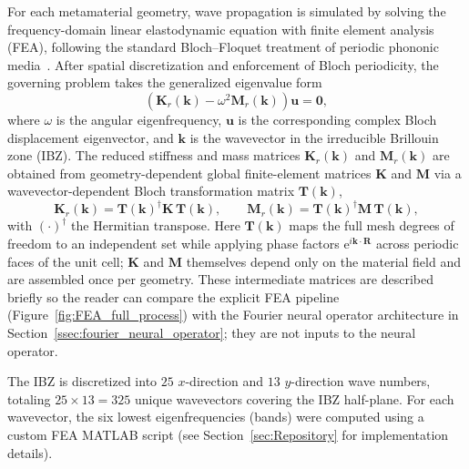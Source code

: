 \documentclass[preprint,review,12pt,numafflabel]{elsarticle}
\begin{document}
For each metamaterial geometry, wave propagation is simulated by solving the frequency-domain linear elastodynamic equation with finite element analysis (FEA), following the standard Bloch--Floquet treatment of periodic phononic media~\cite{hussein2014dynamics,kushwaha1993acoustic}. After spatial discretization and enforcement of Bloch periodicity, the governing problem takes the generalized eigenvalue form
\begin{equation}
\label{eqn:eig_PDE}
\left( \mathbf{K}_r(\mathbf{k}) - \omega^2 \mathbf{M}_r(\mathbf{k}) \right) \mathbf{u} = \mathbf{0},
\end{equation}
where $\omega$ is the angular eigenfrequency, $\mathbf{u}$ is the corresponding complex Bloch displacement eigenvector, and $\mathbf{k}$ is the wavevector in the irreducible Brillouin zone (IBZ). The reduced stiffness and mass matrices $\mathbf{K}_r(\mathbf{k})$ and $\mathbf{M}_r(\mathbf{k})$ are obtained from geometry-dependent global finite-element matrices $\mathbf{K}$ and $\mathbf{M}$ via a wavevector-dependent Bloch transformation matrix $\mathbf{T}(\mathbf{k})$,
\begin{equation}
\label{eqn:reduced_KM}
\mathbf{K}_r(\mathbf{k}) = \mathbf{T}(\mathbf{k})^{\dagger}\mathbf{K}\,\mathbf{T}(\mathbf{k}),
\qquad
\mathbf{M}_r(\mathbf{k}) = \mathbf{T}(\mathbf{k})^{\dagger}\mathbf{M}\,\mathbf{T}(\mathbf{k}),
\end{equation}
with $(\cdot)^{\dagger}$ the Hermitian transpose. Here $\mathbf{T}(\mathbf{k})$ maps the full mesh degrees of freedom to an independent set while applying phase factors $\mathrm{e}^{i\mathbf{k}\cdot\mathbf{R}}$ across periodic faces of the unit cell; $\mathbf{K}$ and $\mathbf{M}$ themselves depend only on the material field and are assembled once per geometry. These intermediate matrices are described briefly so the reader can compare the explicit FEA pipeline (Figure~\ref{fig:FEA_full_process}) with the Fourier neural operator architecture in Section~\ref{ssec:fourier_neural_operator}; they are not inputs to the neural operator.

The IBZ is discretized into $25$ $x$-direction and $13$ $y$-direction wave numbers, totaling $25 \times 13 = 325$ unique wavevectors covering the IBZ half-plane. For each wavevector, the six lowest eigenfrequencies (bands) were computed using a custom FEA MATLAB script (see Section~\ref{sec:Repository} for implementation details). 
\end{document}
